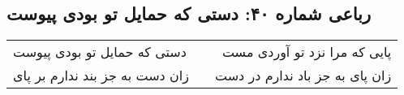 \begin{center}
\section*{رباعی شماره ۴۰: دستی که حمایل تو بودی پیوست}
\label{sec:sh040}
\begin{longtable}{l p{0.5cm} r}
دستی که حمایل تو بودی پیوست
&&
پایی که مرا نزد تو آوردی مست
\\
زان دست به جز بند ندارم بر پای
&&
زان پای به جز باد ندارم در دست
\\
\end{longtable}
\end{center}
